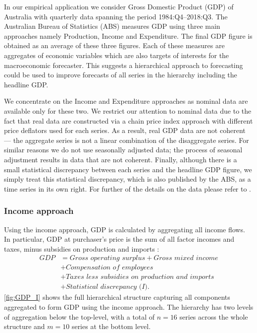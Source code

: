 \documentclass[graybox]{svmult}
\begin{document}
In our empirical application we consider Gross Domestic Product (GDP) of Australia with quarterly data spanning the period 1984:Q4--2018:Q3. The Australian Bureau of Statistics (ABS) measures GDP using three main approaches namely Production, Income and Expenditure. The final GDP figure is obtained as an average of these three figures. Each of these measures are aggregates of economic variables which are also targets of interests for the macroeconomic forecaster. This suggests a hierarchical approach to forecasting could be used to improve forecasts of all series in the hierarchy including the headline GDP.

We concentrate on the Income and Expenditure approaches as nominal data are available only for these two. We restrict our attention to nominal data due to the fact that real data are constructed via a chain price index approach with different price deflators used for each series. As a result, real GDP data are not coherent --- the aggregate series is not a linear combination of the disaggregate series. For similar reasons we do not use seasonally adjusted data; the process of seasonal adjustment results in data that are not coherent. Finally, although there is a small statistical discrepancy between each series and the headline GDP figure, we simply treat this statistical discrepancy, which is also published by the ABS, as a time series in its own right. For further of the details on the data please refer to \citet{ABS2018}.


\subsubsection*{Income approach}

Using the income approach, GDP is calculated by aggregating all income flows. In particular, GDP at purchaser's price is the sum of all factor incomes and taxes, minus subsidies on production and imports \citep{ABS2015}:
\begin{align*}
	\textit{GDP}
	  & = \textit{Gross operating surplus} + \textit{Gross mixed income} \\
	  & + \textit{Compensation of employees} \\
	  & + \textit{Taxes less subsidies on production and imports} \\
	  & + \textit{Statistical discrepancy (I)}.
\end{align*}
\autoref{fig:GDP_I} shows the full hierarchical structure capturing all components aggregated to form GDP using the income approach. The hierarchy has two levels of aggregation below the top-level, with a total of $n=16$ series across the whole structure and $m=10$ series at the bottom level.
\end{document}
